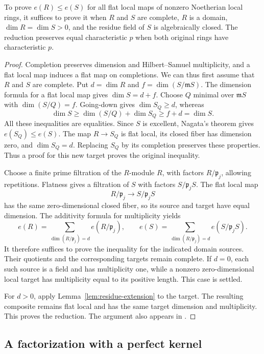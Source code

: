 \begin{lemma}\label{lem:reduction}
To prove $e(R)\leq e(S)$ for all flat local maps of nonzero Noetherian
local rings, it suffices to prove it when $R$ and $S$ are complete,
$R$ is a domain, $\dim R=\dim S>0$, and the residue field of $S$ is
algebraically closed.  The reduction preserves equal characteristic
$p$ when both original rings have characteristic $p$.
\end{lemma}

\begin{proof}
Completion preserves dimension and Hilbert--Samuel multiplicity, and
a flat local map induces a flat map on completions.  We can thus first
assume that $R$ and $S$ are complete.  Put $d=\dim R$ and
$f=\dim(S/\mathfrak mS)$.  The dimension formula for a flat local map
gives $\dim S=d+f$.  Choose $Q$ minimal over $\mathfrak mS$ with
$\dim(S/Q)=f$.  Going-down gives $\dim S_Q\geq d$, whereas
\[
  \dim S\geq\dim(S/Q)+\dim S_Q\geq f+d=\dim S.
\]
All these inequalities are equalities.  Since $S$ is excellent,
Nagata's theorem gives $e(S_Q)\leq e(S)$.  The map $R\to S_Q$ is flat
local, its closed fiber has dimension zero, and $\dim S_Q=d$.
Replacing $S_Q$ by its completion preserves these properties.  Thus a
proof for this new target proves the original inequality.

Choose a finite prime filtration of the $R$-module $R$, with factors
$R/\mathfrak p_j$, allowing repetitions.  Flatness gives a filtration
of $S$ with factors $S/\mathfrak p_jS$.  The flat local map
\[
  R/\mathfrak p_j\longrightarrow S/\mathfrak p_jS
\]
has the same zero-dimensional closed fiber, so its source and target
have equal dimension.  The additivity formula for multiplicity yields
\[
 e(R)=\sum_{\dim(R/\mathfrak p_j)=d}e(R/\mathfrak p_j),\qquad
 e(S)=\sum_{\dim(R/\mathfrak p_j)=d}e(S/\mathfrak p_jS).
\]
It therefore suffices to prove the inequality for the indicated domain
sources.  Their quotients and the corresponding targets remain
complete.  If $d=0$, each such source is a field and has multiplicity
one, while a nonzero zero-dimensional local target has multiplicity
equal to its positive length.  This case is settled.

For $d>0$, apply Lemma~\ref{lem:residue-extension} to the target.
The resulting composite remains flat local and has the same target
dimension and multiplicity.  This proves the reduction.  The argument
also appears in \cite[Lemma~2.2]{Ma}.
\end{proof}

\subsection{A factorization with a perfect kernel}

